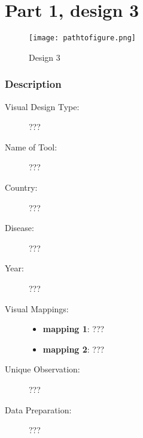 \hypertarget{part-1-design-3}{%
\section{Part 1, design 3}\label{part-1-design-3}}

\begin{figure}
\centering
\texttt{[image: pathtofigure.png]}
\caption{Design 3}
\end{figure}

\hypertarget{description}{%
\subsubsection{Description}\label{description}}

\begin{description}
\item[Visual Design Type:]
???
\item[Name of Tool:]
???
\item[Country:]
???
\item[Disease:]
???
\item[Year:]
???
\item[Visual Mappings:]
\begin{itemize}
\tightlist
\item
  \textbf{mapping 1}: ???
\end{itemize}

\begin{itemize}
\tightlist
\item
  \textbf{mapping 2}: ???
\end{itemize}
\item[Unique Observation:]
???
\item[Data Preparation:]
???
\end{description}
